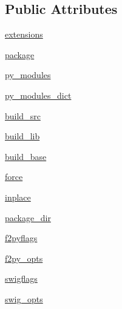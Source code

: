\subsection*{Public Attributes}
\begin{DoxyCompactItemize}
\item 
\hyperlink{classnumpy_1_1distutils_1_1command_1_1build__src_1_1build__src_a979cfe0429b2c74a7c88f11a81678686}{extensions}
\item 
\hyperlink{classnumpy_1_1distutils_1_1command_1_1build__src_1_1build__src_a1773029814022602340dec068a6afb75}{package}
\item 
\hyperlink{classnumpy_1_1distutils_1_1command_1_1build__src_1_1build__src_a65badfe2609410415cc9f19d51070a54}{py\+\_\+modules}
\item 
\hyperlink{classnumpy_1_1distutils_1_1command_1_1build__src_1_1build__src_abd76ea819fcbab3872714a67abfc60d6}{py\+\_\+modules\+\_\+dict}
\item 
\hyperlink{classnumpy_1_1distutils_1_1command_1_1build__src_1_1build__src_a9e242db28fba19352e179710c0c87cfb}{build\+\_\+src}
\item 
\hyperlink{classnumpy_1_1distutils_1_1command_1_1build__src_1_1build__src_a917ae7ee7be1e667800236b8ebfefc7e}{build\+\_\+lib}
\item 
\hyperlink{classnumpy_1_1distutils_1_1command_1_1build__src_1_1build__src_aef7ae7f352a02f2c79a47a8390d49349}{build\+\_\+base}
\item 
\hyperlink{classnumpy_1_1distutils_1_1command_1_1build__src_1_1build__src_ae63911be7ce59661efbb49d9865a3133}{force}
\item 
\hyperlink{classnumpy_1_1distutils_1_1command_1_1build__src_1_1build__src_a4e34707ae7b4f1631f8aab06f77f2410}{inplace}
\item 
\hyperlink{classnumpy_1_1distutils_1_1command_1_1build__src_1_1build__src_af654d32258cdf7cbdf147f28c031d606}{package\+\_\+dir}
\item 
\hyperlink{classnumpy_1_1distutils_1_1command_1_1build__src_1_1build__src_a7cabe12e5018e3f045e47f446a793a98}{f2pyflags}
\item 
\hyperlink{classnumpy_1_1distutils_1_1command_1_1build__src_1_1build__src_af1721436fc37c1ae33dacf2c1a79e01d}{f2py\+\_\+opts}
\item 
\hyperlink{classnumpy_1_1distutils_1_1command_1_1build__src_1_1build__src_a78fb20d586a62ad1024eb6d16d668311}{swigflags}
\item 
\hyperlink{classnumpy_1_1distutils_1_1command_1_1build__src_1_1build__src_a77353ac05e80264d7022e795c25331ff}{swig\+\_\+opts}

\end{DoxyCompactItemize}
